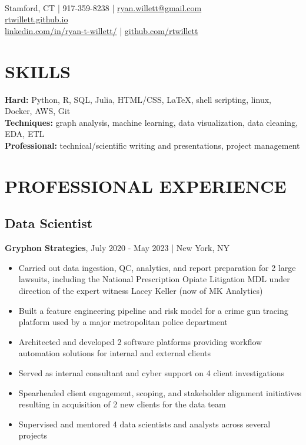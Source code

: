 \documentclass[11pt]{article}
\title{\vspace{-7cm}}
\date{}
\author{Ryan Willett}
\newenvironment{myitemize}
{ \begin{itemize}
	\setlength{\itemsep}{0pt}
	\setlength{\parskip}{0pt}
	\setlength{\parsep}{0pt}     }
{ \end{itemize}                  }
\begin{document}
\maketitle

\section*{}
  \\
\normalsize
Stamford, CT | 917-359-8238 | \href{mailto:ryan.willett@gmail.com}{ryan.willett@gmail.com} \\
\href{http://rtwillett.github.io}{rtwillett.github.io} \\
\href{https://linkedin.com/in/ryan-t-willett/}{linkedin.com/in/ryan-t-willett/} | \href{https://github.com/rtwillett}{github.com/rtwillett}

\raggedright

\section*{SKILLS}
{\bfseries Hard:} Python, R, SQL, Julia, HTML/CSS, \LaTeX, shell scripting, linux, Docker, AWS, Git \\
{\bfseries Techniques:} graph analysis, machine learning, data visualization, data cleaning, EDA, ETL \\
{\bfseries Professional:} technical/scientific writing and presentations, project management

\section*{PROFESSIONAL EXPERIENCE}
\subsection*{Data Scientist}
{\bfseries Gryphon Strategies}, July 2020 - May 2023 | New York, NY
\begin{myitemize}
	\item Carried out data ingestion, QC, analytics, and report preparation for 2 large lawsuits, including the National Prescription Opiate Litigation MDL under direction of the expert witness Lacey Keller (now of MK Analytics)
	\item Built a feature engineering pipeline and risk model for a crime gun tracing platform used by a major metropolitan police department
	\item Architected and developed 2 software platforms providing workflow automation solutions for internal and external clients
	\item Served as internal consultant and cyber support on 4 client investigations
	\item Spearheaded client engagement, scoping, and stakeholder alignment initiatives resulting in acquisition of 2 new clients for the data team
	\item Supervised and mentored 4 data scientists and analysts across several projects
\end{myitemize}
\end{document}
